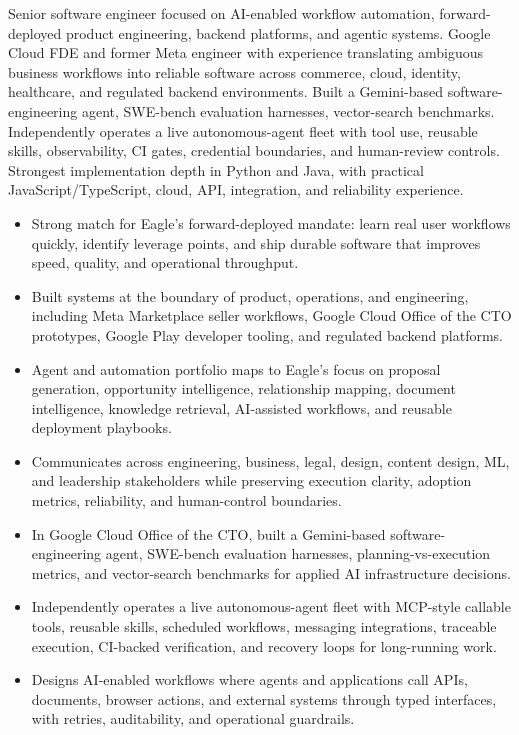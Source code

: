 


Senior software engineer focused on AI-enabled workflow automation, forward-deployed product engineering, backend platforms, and agentic systems. Google Cloud FDE and former Meta engineer with experience translating ambiguous business workflows into reliable software across commerce, cloud, identity, healthcare, and regulated backend environments. Built a Gemini-based software-engineering agent, SWE-bench evaluation harnesses, vector-search benchmarks. Independently operates a live autonomous-agent fleet with tool use, reusable skills, observability, CI gates, credential boundaries, and human-review controls. Strongest implementation depth in Python and Java, with practical JavaScript/TypeScript, cloud, API, integration, and reliability experience.
\begin{itemize}
  \item Strong match for Eagle's forward-deployed mandate: learn real user workflows quickly, identify leverage points, and ship durable software that improves speed, quality, and operational throughput.
  \item Built systems at the boundary of product, operations, and engineering, including Meta Marketplace seller workflows, Google Cloud Office of the CTO prototypes, Google Play developer tooling, and regulated backend platforms.
  \item Agent and automation portfolio maps to Eagle's focus on proposal generation, opportunity intelligence, relationship mapping, document intelligence, knowledge retrieval, AI-assisted workflows, and reusable deployment playbooks.
  \item Communicates across engineering, business, legal, design, content design, ML, and leadership stakeholders while preserving execution clarity, adoption metrics, reliability, and human-control boundaries.
\end{itemize}
\begin{itemize}
  \item In Google Cloud Office of the CTO, built a Gemini-based software-engineering agent, SWE-bench evaluation harnesses, planning-vs-execution metrics, and vector-search benchmarks for applied AI infrastructure decisions.
  \item Independently operates a live autonomous-agent fleet with MCP-style callable tools, reusable skills, scheduled workflows, messaging integrations, traceable execution, CI-backed verification, and recovery loops for long-running work.
  \item Designs AI-enabled workflows where agents and applications call APIs, documents, browser actions, and external systems through typed interfaces, with retries, auditability, and operational guardrails.
\end{itemize}
